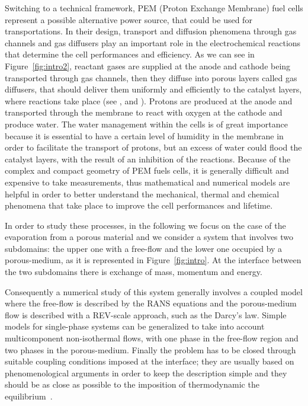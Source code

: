 Switching to a technical framework, PEM (Proton Exchange Membrane) fuel cells represent a possible alternative power source, that could be used for transportations. In their design, transport and diffusion phenomena through gas channels and gas diffusers play an important role in the electrochemical reactions that determine the cell performances and efficiency. As we can see in Figure~\ref{fig:intro2}, reactant gases are supplied at the anode and cathode being transported through gas channels, then they diffuse into porous layers called gas diffusers, that should deliver them uniformly and efficiently to the catalyst layers, where reactions take place (see \cite{wu:fuelcell}, \cite{tesi:baber} and \cite{tesi:pem}). Protons are produced at the anode and transported through the membrane to react with oxygen at the cathode and produce water. The water management within the cells is of great importance because it is essential to have a certain level of humidity in the membrane in order to facilitate the transport of protons, but an excess of water could flood the catalyst layers, with the result of an inhibition of the reactions.
Because of the complex and compact geometry of PEM fuels cells, it is generally difficult and expensive to take measurements, thus mathematical and numerical models are helpful in order to better understand the mechanical, thermal and chemical phenomena that take place to improve the cell performances and lifetime.

In order to study these processes, in the following we focus on the case of the evaporation from 
a porous material and we consider a system that involves two subdomains: the 
upper one with a free-flow and the lower one occupied by a porous-medium, as it is represented in Figure~\ref{fig:intro}.
At the interface between the two subdomains there is exchange of mass, momentum and 
energy.

Consequently a numerical study of this system generally involves a coupled 
model where the free-flow is described by the RANS equations and the 
porous-medium flow is described with a REV-scale approach, such as the Darcy's 
law. 
Simple models for single-phase systems can be generalized to take 
into account multicomponent non-isothermal flows, with one phase in the 
free-flow region and two phases in the porous-medium. Finally the problem 
has to be closed through suitable coupling conditions imposed at the 
interface; they are usually based on phenomenological arguments in order to 
keep the description simple and they should be as close as possible to the 
imposition of thermodynamic the equilibrium~\cite{paper:mosthaf}.

